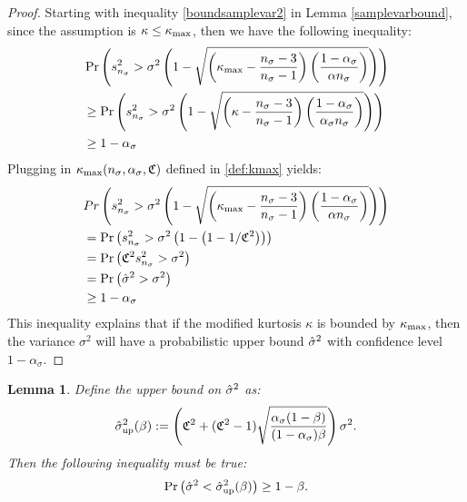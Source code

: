 \documentclass{iitthesis}
\newtheorem{lemma}[theorem]{Lemma}
\theoremstyle{definition}
\begin{document}
\begin{proof}
Starting with inequality \eqref{boundsamplevar2} in Lemma \ref{samplevarbound}, since the assumption is $\kappa \leq \kappa_{\max}$, then we have the following inequality: 
\begin{align*}
&\Pr\left( s_{n_{\sigma}}^2 > \sigma^2 \left (1-\sqrt{\left (\kappa_{\max} -\frac{n_{\sigma}-3}{n_{\sigma}-1}\right)\left (\frac{1-\alpha_{\sigma}}{\alpha n_{\sigma}}\right )}\right)\right)\\& \geq\Pr\left( s_{n_{\sigma}}^2 > \sigma^2 \left (1-\sqrt{\left (\kappa-\frac{n_{\sigma}-3}{n_{\sigma}-1}\right)\left (\frac{1-\alpha_{\sigma}}{\alpha_{\sigma} n_{\sigma}}\right )}\right)\right)\\&\geq1-\alpha_{\sigma} 
\end{align*}
 Plugging in $\kappa_{\max}(n_\sigma,\alpha_\sigma, \mathfrak{C})$ defined in \eqref{def:kmax} yields:
 \begin{align*}
&Pr\left( s_{n_{\sigma}}^2 > \sigma^2 \left (1-\sqrt{\left (\kappa_{\max} -\frac{n_{\sigma}-3}{n_{\sigma}-1}\right)\left (\frac{1-\alpha_{\sigma}}{\alpha n_{\sigma}}\right )}\right)\right)\\&
=  \Pr\left( s_{n_{\sigma}}^2 > \sigma^2 \left (1-\left(1-1/\mathfrak{C}^2\right)\right) \right) \\&
=\Pr\left(\mathfrak{C}^2s_{n_{\sigma}}^2  > \sigma^2 \right) \\&
=\Pr\left(\hat{\sigma}^2  > \sigma^2 \right) \\&
\geq  1-\alpha_{\sigma} 
\end{align*}
This inequality explains that if the modified kurtosis $\kappa$ is bounded by $\kappa_{\max}$, then the variance $\sigma^2$ will have a probabilistic upper bound $\hat{\sigma}^2$ with confidence level $1-\alpha_{\sigma}$.
\end{proof}

\begin{lemma}\label{upperboundhsigma}
Define the upper bound on $\hat{\sigma}^2$ as:
\begin{align}\label{sigup}
\hat{\sigma}_{\operatorname{up}}^2 (\beta) := \left(\mathfrak{C}^2+(\mathfrak{C}^2-1)\sqrt{\frac{\alpha_{\sigma}(1-\beta)}{(1-\alpha_{\sigma})\beta}}\right)\sigma^2.
\end{align}
Then the following inequality must be true: 
\begin{align}\label{hsighsigupineq}
\Pr\left(\hat{\sigma}^2 <\hat{\sigma}_{\operatorname{up}}^2(\beta)\right) \geq 1-\beta.
\end{align}
\end{lemma}
\end{document}
